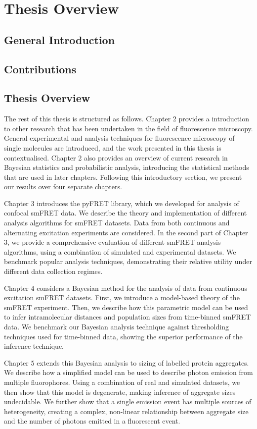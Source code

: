 \chapter{Thesis Overview}
\section{General Introduction}
\section{Contributions}
\section{Thesis Overview}
The rest of this thesis is structured as follows. Chapter 2 provides a introduction to other research that has been undertaken in the field of fluorescence microscopy. General experimental and analysis techniques for fluorescence microscopy of single molecules are introduced, and the work presented in this thesis is contextualised. Chapter 2 also provides an overview of current research in Bayesian statistics and probabilistic analysis, introducing the statistical methods that are used in later chapters. Following this introductory section, we present our results over four separate chapters.

Chapter 3 introduces the pyFRET library, which we developed for analysis of confocal smFRET data. We describe the theory and implementation of different analysis algorithms for smFRET datasets. Data from both continuous and alternating excitation experiments are considered. In the second part of Chapter 3, we provide a comprehensive evaluation of different smFRET analysis algorithms, using a combination of simulated and experimental datasets. We benchmark popular analysis techniques, demonstrating their relative utility under different data collection regimes.

Chapter 4 considers a Bayesian method for the analysis of data from continuous excitation smFRET datasets. First, we introduce a model-based theory of the smFRET experiment. Then, we describe how this parametric model can be used to infer intramolecular distances and population sizes from time-binned smFRET data. We benchmark our Bayesian analysis technique against thresholding techniques used for time-binned data, showing the superior performance of the inference technique.

Chapter 5 extends this Bayesian analysis to sizing of labelled protein aggregates. We describe how a simplified model can be used to describe photon emission from multiple fluorophores. Using a combination of real and simulated datasets, we then show that this model is degenerate, making inference of aggregate sizes undecidable. We further show that a single emission event has multiple sources of heterogeneity, creating a complex, non-linear relationship between aggregate size and the number of photons emitted in a fluorescent event.

